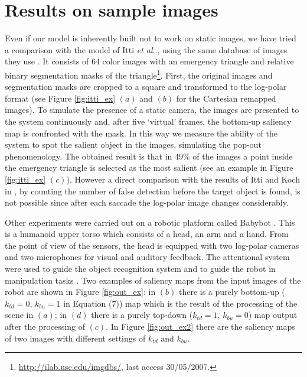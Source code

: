 \documentclass{llncs}
\makeatletter
\DeclareRobustCommand\onedot{\futurelet\@let@token\@onedot}
\def\@onedot{\ifx\@let@token.\else.\null\fi\xspace}
\def\etal{\emph{et al}\onedot}
\makeatother
\begin{document}
\section{Results on sample images}
\label{sec:att_results}
Even if our model is inherently built not to work on static images,
we have tried a comparison with the model of Itti \etal \cite{IttiKN98},
using the same database of images they use \cite{IttiK01b}. It consists of 64 color
images with an emergency triangle and relative binary
segmentation masks of the triangle\footnote{\url{http://ilab.usc.edu/imgdbs/}, last access 30/05/2007.}.
First, the original images and segmentation masks are
cropped to a square and transformed to the log-polar
format (see Figure \ref{fig:itti_ex} $(a)$ and $(b)$
for the Cartesian remapped images). To simulate the
presence of a static camera, the images are presented to
the system continuously and, after five `virtual'
frames, the bottom-up saliency map is confronted with
the mask. In this way we measure the ability of the system to spot
the salient object in the images, simulating the pop-out phenomenology.
The obtained result is that in $49\%$ of the images a point inside the
emergency triangle is selected as the most salient
(see an example in Figure \ref{fig:itti_ex} $(c)$). However a
direct comparison with the results of Itti and Koch in \cite{IttiK01b}, by
counting the number of false detection before the
target object is found, is not possible since after each
saccade the log-polar image changes considerably.

Other experiments were carried out
on a robotic platform called Babybot \cite{NataleOBMS05}. This is a
humanoid upper torso which consists of a head, an arm and a hand. 
From the point of view of the sensors, the head is
equipped with two log-polar cameras
and two microphones for visual and auditory feedback.
The attentional system were used to guide the object recognition system
and to guide the robot in manipulation tasks \cite{NataleOBMS05,Orabona07}.
Two examples of saliency maps from the input images of the robot are shown in
Figure \ref{fig:out_ex}: in $(b)$ there is a purely bottom-up ($k_{td}=0$,
$k_{bu}=1$ in Equation (7)) map which is the result of the
processing of the scene in $(a)$; in $(d)$ there is a purely
top-down ($k_{td}=1$, $k_{bu}=0$) map output after the
processing of $(c)$. In Figure \ref{fig:out_ex2} there are the saliency maps of
two images with different settings of $k_{td}$ and $k_{bu}$.
\end{document}
